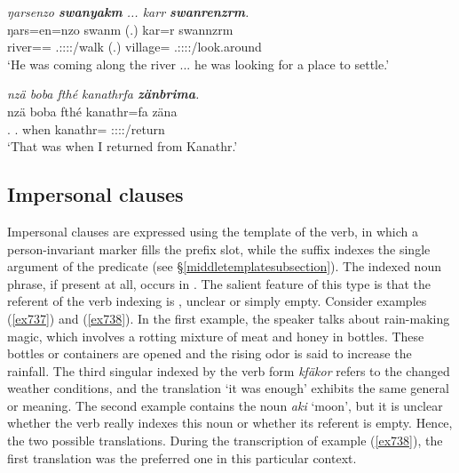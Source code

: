 \begin{exe}
	\ex \emph{ŋarsenzo \textbf{swanyakm} ... karr \textbf{swanrenzrm}.}\\
	\gll ŋars=en=nzo swanm (.) kar=r swannzrm\\
	river=\Loc=\Only{} \Tsg.\Masc:\Sbj:\Pst:\Dur:\Venit/walk (.) village=\Purp{} \Tsg.\Masc:\Sbj:\Pst:\Dur:\Venit/look.around\\
	\trans `He was coming along the river ... he was looking for a place to settle.'\\
	\label{ex562}
\end{exe}
\begin{exe}
	\ex \emph{nzä boba fthé kanathrfa \textbf{zänbrima}.}\\
	\gll nzä boba fthé kanathr=fa zäna\\
	\Fsg.\Abs{} \Med.\Abl{} when kanathr=\Abl{} \Sg:\Sbj:\Pst:\Pfv:\Venit/return\\
	\trans `That was when I returned from Kanathr.'
	\label{ex563}
\end{exe}

\subsection{Impersonal clauses}\label{impersonalclause}

Impersonal clauses are expressed using the  template of the verb, in which a person-invariant  marker fills the prefix slot, while the suffix indexes the single argument of the predicate (see \S{}\ref{middletemplatesubsection}). The indexed noun phrase, if present at all, occurs in  . The salient feature of this  type is that the referent of the verb indexing is , unclear or simply empty. Consider examples (\ref{ex737}) and (\ref{ex738}). In the first example, the speaker talks about rain-making magic, which involves a rotting mixture of meat and honey in bottles. These bottles or containers are opened and the rising odor is said to increase the rainfall. The third singular indexed by the verb form \emph{kfäkor} refers to the changed weather conditions, and the  translation `it was enough' exhibits the same general or  meaning. The second example contains the noun \emph{aki} `moon', but it is unclear whether the verb really indexes this noun or whether its referent is empty. Hence, the two possible translations. During the transcription of example (\ref{ex738}), the first translation was the preferred one in this particular context.

